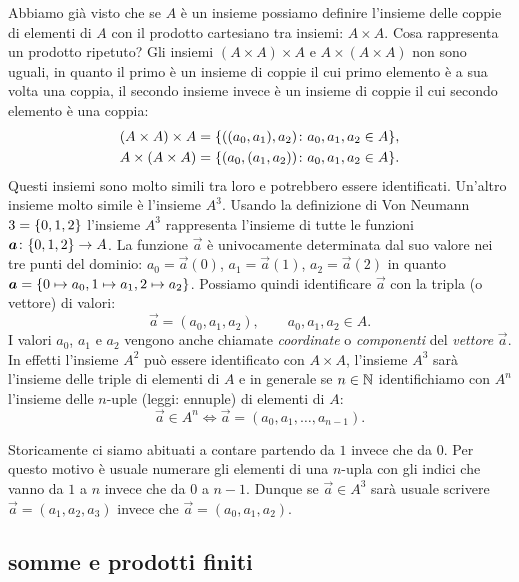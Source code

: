 Abbiamo già visto che se $A$ è un insieme possiamo definire l'insieme 
delle coppie di elementi di $A$ con il prodotto cartesiano tra insiemi: 
$A\times A$. 
Cosa rappresenta un prodotto ripetuto?
Gli insiemi $(A\times A)\times A$ e $A\times(A\times A)$ non sono 
uguali, in quanto il primo è un insieme di coppie il cui primo elemento 
è a sua volta una coppia, il secondo insieme invece è un insieme di coppie 
il cui secondo elemento è una coppia:
\begin{gather*}
  (A\times A)\times A = {\left\{ ((a_0,a_1),a_2)\colon a_0,a_1,a_2\in A \right\}},
  \\
  A \times (A\times A) = {\left\{ (a_0,(a_1,a_2))\colon a_0,a_1,a_2\in A \right\}}.
\end{gather*}
Questi insiemi sono molto simili tra loro e potrebbero essere identificati.
Un'altro insieme molto simile è l'insieme $A^{3}$.  
Usando la definizione di Von Neumann $3 = {\left\{ 0,1,2 \right\}}$ l'insieme 
$A^{3}$ rappresenta l'insieme di tutte le funzioni 
$\boldsymbol a\colon {\left\{ 0,1,2 \right\}}\to A$.
La funzione $\vec a$ è univocamente determinata dal suo valore nei 
tre punti del dominio: $a_0 = \vec a(0)$, $a_1=\vec a(1)$, $a_2=\vec a(2)$
in quanto $\boldsymbol a = {\left\{ 0\mapsto a_0, 1\mapsto a_1, 2\mapsto a_2 \right\}}$.
Possiamo quindi identificare $\vec a$ con la tripla (o vettore) di valori:
\[
  \vec a = (a_0, a_1, a_2), \qquad a_0,a_1,a_2 \in A.  
\]
I valori $a_0$, $a_1$ e $a_2$ vengono anche chiamate \emph{coordinate}
o \emph{componenti} del \emph{vettore} $\vec a$.
%
%
%
%
%
In effetti l'insieme $A^{2}$ può essere identificato con $A\times A$, l'insieme 
$A^{3}$ sarà l'insieme delle triple di elementi di $A$ e in generale se $n\in{\mathbb N}$ 
identifichiamo con $A^{n}$ l'insieme delle $n$-uple (leggi: ennuple) di elementi 
%
di $A$:%
%
\[
   \vec a \in A^{n} \iff 
   \vec a = (a_0, a_1, \dots, a_{n-1}).  
\]

Storicamente ci siamo abituati a contare partendo da $1$ invece che da $0$.
Per questo motivo è usuale numerare gli elementi di una $n$-upla con gli indici 
che vanno da $1$ a $n$ invece che da $0$ a $n-1$.
Dunque se $\vec a \in A^{3}$ sarà usuale scrivere 
$\vec a = (a_1, a_2, a_3)$ invece che $\vec a = (a_0, a_1, a_2)$.

\subsection{somme e prodotti finiti}
%
%

